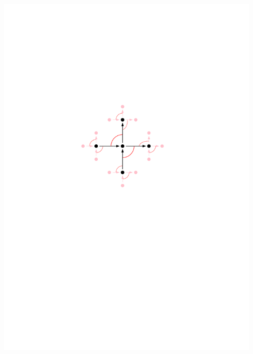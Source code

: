 \documentclass[portrait,final,a0paper,fontscale=0.25]{baposter}
\theoremstyle{definition}
\begin{document}
\begin{poster}
{\vspace*{-2.2cm}\hspace*{7.5cm}\includegraphics[scale=.3]{BlossomingQuiverGentle}

}
\end{poster}
\end{document}

